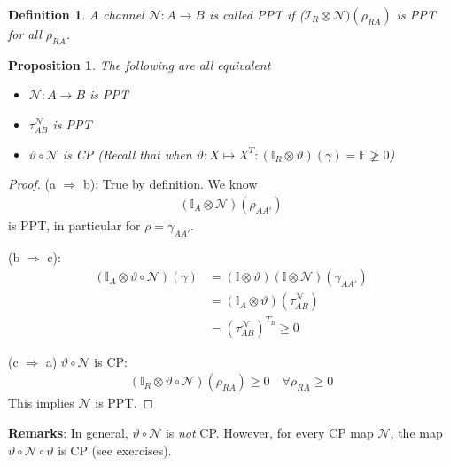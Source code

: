 \documentclass[10pt,oneside,longbibliography]{report}
\newtheorem{proposition}{Proposition}[section]
\newtheorem{definition}{Definition}[section]
\begin{document}
\begin{definition}
A channel $\mathcal{N}: A \rightarrow B$ is called PPT if ($\mathcal{I}_R \otimes \mathcal{N})(\rho_{RA})$ is PPT for all $\rho_{RA}$.
\end{definition}

\begin{proposition}
The following are all equivalent
\begin{itemize}
    \item $\mathcal{N}: A\rightarrow B$ is PPT
    \item $\tau^{\mathcal{N}}_{AB}$ is PPT 
    \item $\vartheta \circ \mathcal{N}$ is CP (Recall that when $\vartheta: X \mapsto X^T: (\mathbb{I}_R \otimes \vartheta)(\gamma)= \mathbb{F} \ngeq 0$)
\end{itemize}
\end{proposition}

\begin{tcolorbox}[colframe=black,breakable, colback=black!5, arc=0pt, outer arc=0pt,boxrule=0.5pt]
\begin{proof}
(a $\Rightarrow$ b): True by definition. We know
\begin{align}
    (\mathbb{I}_A \otimes \mathcal{N})(\rho_{AA'})
\end{align}
is PPT, in particular for $\rho=\gamma_{AA'}$.

(b $\Rightarrow$ c): \begin{align}
    (\mathbb{I}_A \otimes \vartheta \circ \mathcal{N})(\gamma) &= (\mathbb{I}\otimes \vartheta)(\mathbb{I} \otimes \mathcal{N})(\gamma_{AA'}) \\
    &= (\mathbb{I}_A \otimes \vartheta) (\tau_{AB}^{\mathcal{N}}) \\
    &= (\tau_{AB}^{\mathcal{N}})^{T_B} \geq 0 
\end{align}

(c $\Rightarrow$ a) $\vartheta \circ \mathcal{N}$ is CP: 
\begin{align}
    (\mathbb{I}_R \otimes \vartheta \circ \mathcal{N})(\rho_{RA}) \geq 0 \quad \forall \rho_{RA} \geq 0
\end{align}
This implies $\mathcal{N}$ is PPT.
\end{proof}
\end{tcolorbox}

\textbf{Remarks}: In general, $\vartheta \circ \mathcal{N}$ is \textit{not} CP. However, for every CP map $\mathcal{N}$, the map $\vartheta \circ \mathcal{N} \circ \vartheta$ is CP (see exercises).
\end{document}
